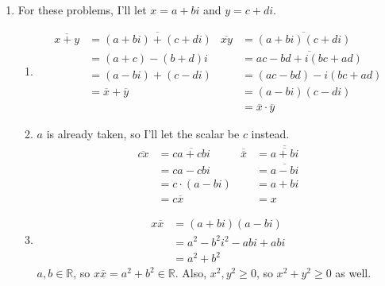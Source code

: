 \documentclass[12pt]{article}
\begin{document}
\begin{enumerate}
            \pagebreak

      \item For these problems, I'll let $x=a+bi$ and $y=c+di$.
            \begin{enumerate}
                  \item \begin{align*}
                              \overline{x+y} & = \overline{(a+bi)+(c+di)}  & \overline{xy} & = \overline{(a+bi)(c+di)}        \\
                                             & =(a+c)-(b+d)i               &               & = \overline{ac-bd+i(bc+ad)}      \\
                                             & = (a-bi)+(c-di)             &               & = (ac-bd)-i(bc+ad)               \\
                                             & = \overline{x}+\overline{y} &               & =(a-bi)(c-di)                    \\
                                             &                             &               & =\overline{x} \cdot \overline{y}
                        \end{align*}
                  \item $a$ is already taken, so I'll let the scalar be $c$ instead.
                        \begin{align*}
                              \overline{cx} & = \overline{ca+cbi} & \overline{\overline{x}} & = \overline{\overline{a+bi}} \\
                                            & = ca-cbi            &                         & = \overline{a-bi}            \\
                                            & = c \cdot (a-bi)    &                         & = a+bi                       \\
                                            & = c\overline{x}     &                         & = x
                        \end{align*}
                  \item \begin{align*}
                              x\overline{x} & = (a+bi)(a-bi)      \\
                                            & =a^2-b^2i^2-abi+abi \\
                                            & = a^2+b^2
                        \end{align*}
                        $a, b \in \mathbb{R}$, so $x\overline{x}=a^2+b^2 \in \mathbb{R}$.
                        Also, $x^2, y^2 \ge 0$, so $x^2+y^2 \ge 0$ as well.


\end{enumerate}
\end{enumerate}
\end{document}
